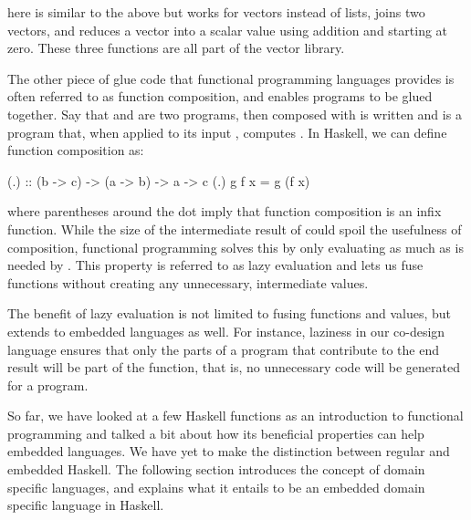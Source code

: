 \documentclass[../paper.tex]{subfiles}
\begin{document}

\noindent {} here is similar to the above  but works for vectors instead of lists,  joins two vectors, and  reduces a vector into a scalar value using addition and starting at zero. These three functions are all part of the vector library.

The other piece of glue code that functional programming languages provides is often referred to as function composition, and enables programs to be glued together. Say that  and  are two programs, then  composed with  is written  and is a program that, when applied to its input , computes . In Haskell, we can define function composition as:

\begin{code}
(.) :: (b -> c) -> (a -> b) -> a -> c
(.) g f x = g (f x)
\end{code}

\noindent where parentheses around the dot imply that function composition is an infix function. While the size of the intermediate result of  could spoil the usefulness of composition, functional programming solves this by only evaluating  as much as is needed by . This property is referred to as lazy evaluation and lets us fuse functions without creating any unnecessary, intermediate values.

The benefit of lazy evaluation is not limited to fusing functions and values, but extends to embedded languages as well. For instance, laziness in our co-design language ensures that only the parts of a program that contribute to the end result will be part of the function, that is, no unnecessary code will be generated for a program.

So far, we have looked at a few Haskell functions as an introduction to functional programming and talked a bit about how its beneficial properties can help embedded languages. We have yet to make the distinction between regular and embedded Haskell. The following section introduces the concept of domain specific languages, and explains what it entails to be an embedded domain specific language in Haskell.
\end{document}
